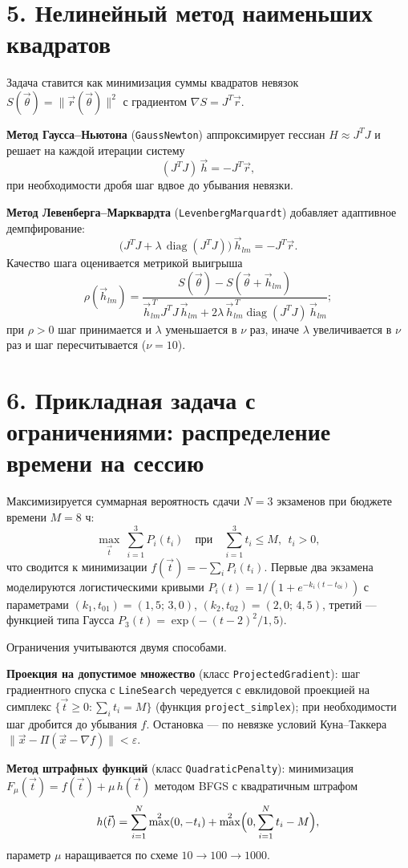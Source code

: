 \documentclass[a4paper]{article}
\newcommand{\subsectiontext}[1]{%
    \section*{\fontsize{13pt}{0pt}\selectfont\textbf{#1}}%
}
\begin{document}
\subsectiontext{5. Нелинейный метод наименьших квадратов}

Задача ставится как минимизация суммы квадратов невязок $S(\vec{\theta}) = \|\vec{r}(\vec{\theta})\|^2$ с градиентом $\nabla S = J^T \vec{r}$.

\textbf{Метод Гаусса–Ньютона} (\texttt{GaussNewton}) аппроксимирует гессиан $H \approx J^T J$ и решает на каждой итерации систему
\[
    (J^T J)\, \vec{h} = -J^T \vec{r},
\]
при необходимости дробя шаг вдвое до убывания невязки.

\textbf{Метод Левенберга–Марквардта} (\texttt{LevenbergMarquardt}) добавляет адаптивное демпфирование:
\[
    \bigl(J^T J + \lambda\, \operatorname{diag}(J^T J)\bigr)\, \vec{h}_{lm} = -J^T \vec{r}.
\]
Качество шага оценивается метрикой выигрыша
\[
    \rho(\vec{h}_{lm}) = \frac{S(\vec{\theta}) - S(\vec{\theta} + \vec{h}_{lm})}{\vec{h}_{lm}^{\,T} J^T J\, \vec{h}_{lm} + 2\lambda\, \vec{h}_{lm}^{\,T} \operatorname{diag}(J^T J)\, \vec{h}_{lm}};
\]
при $\rho > 0$ шаг принимается и $\lambda$ уменьшается в $\nu$ раз, иначе $\lambda$ увеличивается в $\nu$ раз и шаг пересчитывается ($\nu = 10$).

\subsectiontext{6. Прикладная задача с ограничениями: распределение времени на сессию}

Максимизируется суммарная вероятность сдачи $N = 3$ экзаменов при бюджете времени $M = 8$ ч:
\[
    \max_{\vec{t}}\ \sum_{i=1}^{3} P_i(t_i)
    \quad \text{при} \quad
    \sum_{i=1}^{3} t_i \le M,\ \ t_i > 0,
\]
что сводится к минимизации $f(\vec{t}) = -\sum_i P_i(t_i)$. Первые два экзамена моделируются логистическими кривыми $P_i(t) = 1/(1 + e^{-k_i(t - t_{0i})})$ с параметрами $(k_1, t_{01}) = (1{,}5;\, 3{,}0)$, $(k_2, t_{02}) = (2{,}0;\, 4{,}5)$, третий — функцией типа Гаусса $P_3(t) = \exp\bigl(-(t-2)^2 / 1{,}5\bigr)$.

Ограничения учитываются двумя способами.

\textbf{Проекция на допустимое множество} (класс \texttt{ProjectedGradient}): шаг градиентного спуска с \texttt{LineSearch} чередуется с евклидовой проекцией на симплекс $\{\vec{t} \ge 0: \sum_i t_i = M\}$ (функция \texttt{project\_simplex}); при необходимости шаг дробится до убывания $f$. Остановка — по невязке условий Куна–Таккера $\|\vec{x} - \Pi(\vec{x} - \nabla f)\| < \varepsilon$.

\textbf{Метод штрафных функций} (класс \texttt{QuadraticPenalty}): минимизация $F_\mu(\vec{t}) = f(\vec{t}) + \mu\, h(\vec{t})$ методом BFGS с квадратичным штрафом
\[
    h(\vec{t}) = \sum_{i=1}^{N} \max^2(0, -t_i) + \max^2\Bigl(0, \sum_{i=1}^{N} t_i - M\Bigr),
\]
параметр $\mu$ наращивается по схеме $10 \to 100 \to 1000$.
\end{document}
